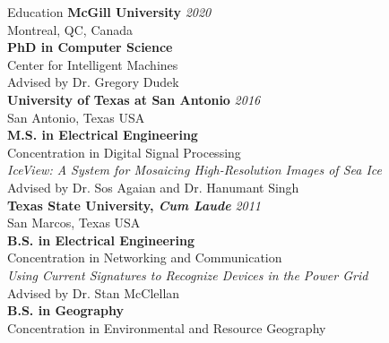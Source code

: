 \documentclass{resume} %
\begin{document}

\begin{rSection}{Education}
{\bf McGill University} \hfill {\em 2020} \\ 
Montreal, QC, Canada \\
{\bf PhD in Computer Science} \\
Center for Intelligent Machines \\
Advised by Dr. Gregory Dudek \\

{\bf University of Texas at San Antonio} \hfill {\em 2016} \\ 
San Antonio, Texas USA \\
{\bf M.S. in Electrical Engineering} \\
Concentration in Digital Signal Processing \\
\textit{IceView: A System for Mosaicing High-Resolution Images of Sea Ice} \\ 
Advised by Dr. Sos Agaian and Dr. Hanumant Singh \smallskip \\

{\bf Texas State University, \textit{Cum Laude}} \hfill {\em 2011} \\ 
San Marcos, Texas USA \\
{\bf B.S. in Electrical Engineering} \\
Concentration in Networking and Communication  \\
\textit{Using Current Signatures to Recognize Devices in the Power Grid}  \\
Advised by Dr. Stan McClellan  \smallskip \\ 
{\bf B.S. in Geography} \\
Concentration in Environmental and Resource Geography \\
\end{rSection}

\end{document}

